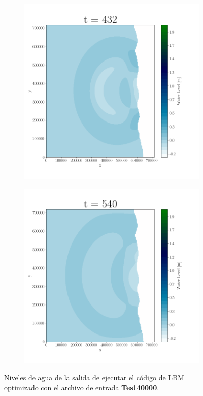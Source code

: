 \begin{figure}[H]
\begin{subfigure}[b]{.4\linewidth}
\includegraphics[width=\linewidth]{Figures/4-5.png}
\caption{}
\end{subfigure}
\begin{subfigure}[b]{.4\linewidth}
\includegraphics[width=\linewidth]{Figures/4-6.png}
\caption{}
\end{subfigure}

\caption{Niveles de agua de la salida de ejecutar el código de LBM optimizado con el archivo de entrada \textbf{Test40000}.}
\label{fig:23}
\end{figure}

